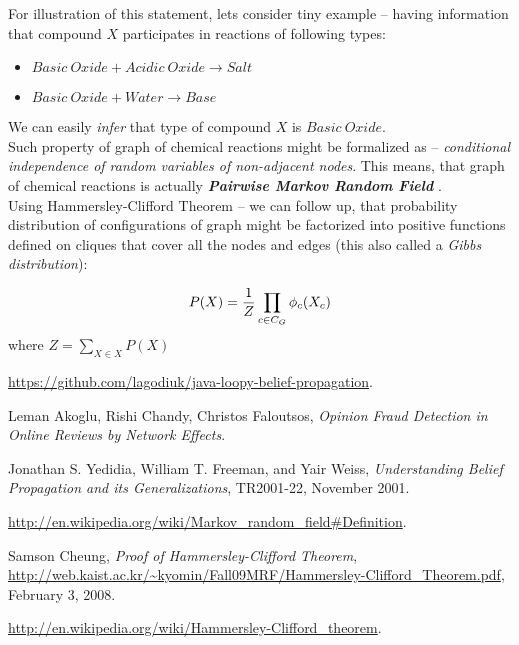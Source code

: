 \documentclass[10pt]{article}
\begin{document}
\noindent For illustration of this statement, lets consider tiny example -- having information that compound $X$ participates in reactions of following types:
\begin{itemize}
    \item $Basic\ Oxide + Acidic\ Oxide \rightarrow Salt$
    \item $Basic\ Oxide + Water \rightarrow Base$
\end{itemize}
We can easily \emph{infer} that type of compound $X$ is $Basic\ Oxide$.
\\

\noindent Such property of graph of chemical reactions might be formalized as -- \emph{conditional independence of random variables of non-adjacent nodes}. This means, that graph of chemical reactions is actually \emph{\textbf{Pairwise Markov Random Field}} \cite{wikipedia_mrf}.
\\

Using Hammersley-Clifford Theorem \cite{hammersley_clifford_proof, wikipedia_hammersley_clifford} -- we can follow up, that probability distribution of configurations of graph might be factorized into positive functions defined on cliques that cover all the nodes and edges (this also called a \emph{Gibbs distribution}):

\begin{equation}
P(X) = {1 \over Z} \prod_{c \in C_G} \phi_{c}(X_c)
\end{equation}
where $Z = \sum_{X \in X} P(X)$


\newpage

\begin{thebibliography}{9}

  \url{https://github.com/lagodiuk/java-loopy-belief-propagation}.

  Leman Akoglu, Rishi Chandy, Christos Faloutsos,
  \emph{Opinion Fraud Detection in Online Reviews by Network Effects}.

  Jonathan S. Yedidia, William T. Freeman, and Yair Weiss,
  \emph{Understanding Belief Propagation and its Generalizations},
  TR2001-22, 
  November 2001.
  
  \url{http://en.wikipedia.org/wiki/Markov_random_field#Definition}.
  
  Samson Cheung,
  \emph{Proof of Hammersley-Clifford Theorem},
  \url{http://web.kaist.ac.kr/~kyomin/Fall09MRF/Hammersley-Clifford_Theorem.pdf},
  February 3, 2008.

  \url{http://en.wikipedia.org/wiki/Hammersley-Clifford_theorem}.

\end{thebibliography}
\end{document}
